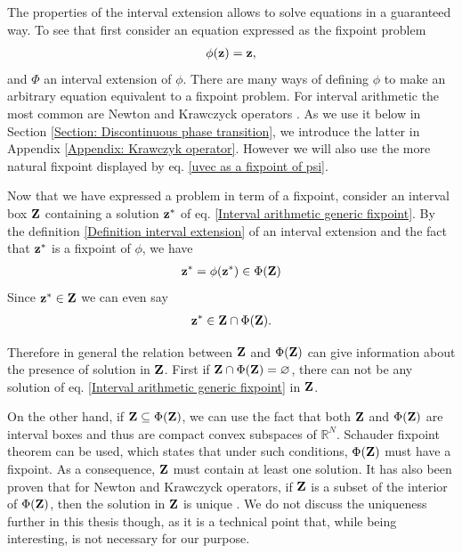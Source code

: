\documentclass[
11pt, %
american, %
singlespacing, %
final, %
nolistspacing, %
liststotoc, %
headsepline, %
]{MastersDoctoralThesis} %
\begin{document}
The properties of the interval extension allows to solve equations in a guaranteed way. To see that first consider an equation expressed as the fixpoint problem
\begin{align}
	\phi(\boldsymbol{\mathrm{z}}) = \boldsymbol{\mathrm{z}},  \label{Interval arithmetic generic fixpoint}
\end{align}
and $\Phi$ an interval extension of $\phi$. There are many ways of defining $\phi$ to make an arbitrary equation equivalent to a fixpoint problem. For interval arithmetic the most common are Newton and Krawczyck  operators \cite{moore2009introduction, tucker2011validated}. As we use it below in Section \ref{Section: Discontinuous phase transition}, we introduce the latter in Appendix \ref{Appendix: Krawczyk operator}. However we will also use the more natural fixpoint displayed by eq. \eqref{uvec as a fixpoint of psi}.

Now that we have expressed a problem in term of a fixpoint, consider an interval box $\boldsymbol{\mathrm{Z}}$ containing a solution $\boldsymbol{\mathrm{z}}^*$ of eq. \eqref{Interval arithmetic generic fixpoint}. By the definition \ref{Definition interval extension} of an interval extension and the fact that $\boldsymbol{\mathrm{z}}^*$ is a fixpoint of $\phi$, we have
\begin{align}
	\boldsymbol{\mathrm{z}}^* = \phi(\boldsymbol{\mathrm{z}}^*) \in \Phi(\boldsymbol{\mathrm{Z}})
\end{align}
Since $\boldsymbol{\mathrm{z}}^* \in \boldsymbol{\mathrm{Z}}$ we can even say
\begin{align}
	\boldsymbol{\mathrm{z}}^* \in \boldsymbol{\mathrm{Z}} \cap \Phi(\boldsymbol{\mathrm{Z}}).  \label{Generic solution refinement}
\end{align}

Therefore in general the relation between $\boldsymbol{\mathrm{Z}}$ and $\Phi(\boldsymbol{\mathrm{Z}})$ can give information about the presence of solution in $\boldsymbol{\mathrm{Z}}$. First if $\boldsymbol{\mathrm{Z}} \cap \Phi(\boldsymbol{\mathrm{Z}}) = \varnothing$, there can not be any solution of eq. \eqref{Interval arithmetic generic fixpoint} in $\boldsymbol{\mathrm{Z}}$.

On the other hand, if $\boldsymbol{\mathrm{Z}} \subseteq \Phi(\boldsymbol{\mathrm{Z}})$, we can use the fact that both $\boldsymbol{\mathrm{Z}}$ and $\Phi(\boldsymbol{\mathrm{Z}})$ are interval boxes and thus are compact convex subspaces of $\mathbb{R}^N$. Schauder fixpoint theorem can be used, which states that under such conditions, $\Phi(\boldsymbol{\mathrm{Z}})$ must have a fixpoint. As a consequence, $\boldsymbol{\mathrm{Z}}$ must contain at least one solution. It has also been proven that for Newton and Krawczyck operators, if $\boldsymbol{\mathrm{Z}}$ is a subset of the interior of $\Phi(\boldsymbol{\mathrm{Z}})$, then the solution in $\boldsymbol{\mathrm{Z}}$ is unique \cite{moore2009introduction, tucker2011validated}. We do not discuss the uniqueness further in this thesis though, as it is a technical point that, while being interesting, is not necessary for our purpose.
\end{document}
